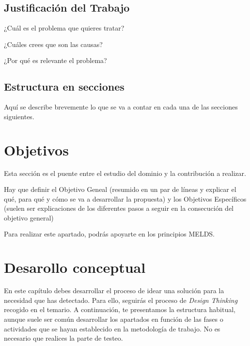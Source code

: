 \documentclass[12pt,a4paper]{proyectoinnovacion}
\begin{document}
\subsection{Justificación del Trabajo}

¿Cuál es el problema que quieres tratar?

¿Cuáles crees que son las causas?

¿Por qué es relevante el problema?


\subsection{Estructura en secciones}

Aquí se describe brevemente lo que se va a contar en cada una de las secciones siguientes.

\section{Objetivos}

Esta sección es el puente entre el estudio del dominio y la contribución a realizar. 

Hay que definir el Objetivo Geneal (resumido en un par de líneas y explicar el qué, para qué y cómo se va a desarrollar la propuesta) y los Objetivos Específicos (suelen ser explicaciones de los diferentes pasos a seguir en la consecución del objetivo general)

Para realizar este apartado, podrás apoyarte en los principios MELDS.


\section{Desarollo conceptual}


En este capítulo debes desarrollar el proceso de idear una solución para la necesidad que has detectado. Para ello, seguirás el proceso de \textit{Design Thinking} recogido en el temario. A continuación, te presentamos la estructura habitual, aunque suele ser común desarrollar los apartados en función de las fases o actividades que se hayan establecido en la metodología de trabajo. No es necesario que realices la parte de testeo.
\end{document}
